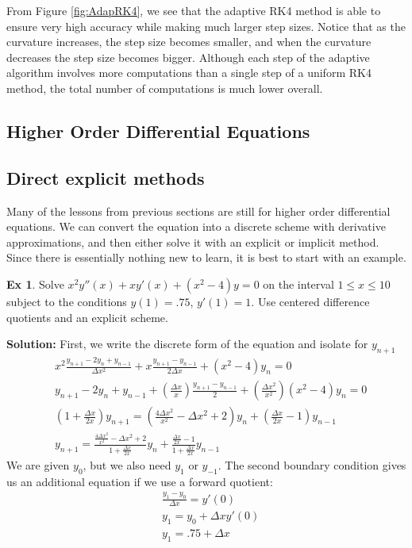 \documentclass[]{article}
\theoremstyle{definition}
\newtheorem{exmp}{Ex}[section]
\numberwithin{equation}{section}
\begin{document}
	From Figure \ref{fig:AdapRK4}, we see that the adaptive RK4 method is able to ensure very high accuracy while making much larger step sizes. Notice that as the curvature increases, the step size becomes smaller, and when the curvature decreases the step size becomes bigger. Although each step of the adaptive algorithm involves more computations than a single step of a uniform RK4 method, the total number of computations is much lower overall.
		
		
	
	\subsection{Higher Order Differential Equations}
	\subsection{Direct explicit methods}
	Many of the lessons from previous sections are still for higher order differential equations. We can convert the equation into a discrete scheme with derivative approximations, and then either solve it with an explicit or implicit method. Since there is essentially nothing new to learn, it is best to start with an example.
	\begin{exmp}
		Solve $x^2y''(x) + xy'(x) + (x^2-4)y = 0$ on the interval $ 1 \leq x \leq 10 $ subject to the conditions $y(1) = .75$, $y'(1) = 1$. Use centered difference quotients and an explicit scheme.
	\end{exmp}
	\textbf{Solution:} First, we write the discrete form of the equation and isolate for $y_{n+1}$
	\begin{align*}
		&x^2 \frac{y_{n+1} - 2y_n + y_{n-1}}{\Delta x^2} + x \frac{y_{n+1}-y_{n-1}}{2\Delta x} + (x^2-4)y_n = 0 \\
		&y_{n+1} - 2y_n + y_{n-1}  + \left(\frac{\Delta x}{x}\right) \frac{y_{n+1}-y_{n-1}}{2} + \left(\frac{\Delta x^2}{x^2}\right)(x^2 - 4) y_n = 0 \\
		&\left(1 + \frac{\Delta x}{2x}\right)y_{n+1} = \left(\frac{4\Delta x^2}{x^2}-\Delta x^2 + 2\right) y_n + \left(\frac{\Delta x}{2x} -1 \right) y_{n-1} \\
		&y_{n+1} = \frac{\frac{4\Delta x^2}{x^2}-\Delta x^2 + 2}{1 + \frac{\Delta x}{2x}} y_n + \frac{\frac{\Delta x}{2x} -1}{1 + \frac{\Delta x}{2x}}y_{n-1}
	\end{align*}
	We are given $y_0$, but we also need $y_1$ or $y_{-1}$. The second boundary condition gives us an additional equation if we use a forward quotient:
	\begin{align*}
	&\frac{y_1 - y_0 }{\Delta x} = y'(0) \\
	&y_1 = y_0 + \Delta x y'(0) \\
	&y_1 = .75 + \Delta x
	\end{align*}
\end{document}
